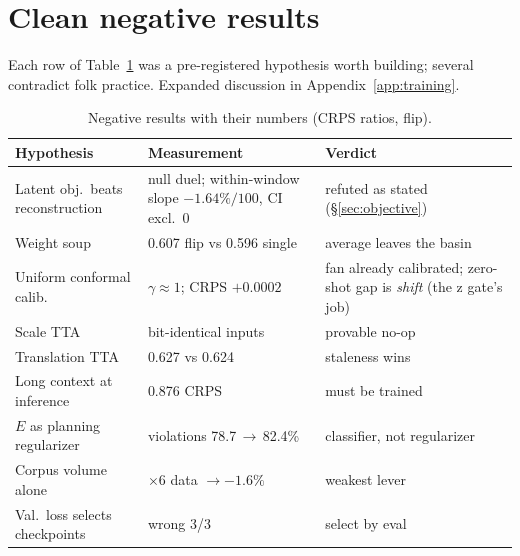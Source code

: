 \section{Clean negative results}
\label{sec:negative}

Each row of Table~\ref{tab:negative} was a pre-registered hypothesis
worth building; several contradict folk practice. Expanded discussion in
Appendix~\ref{app:training}.

\begin{table}[!t]
\centering
\scriptsize
\begin{tabular}{p{2.6cm}p{2.4cm}p{2.4cm}}
\toprule
Hypothesis & Measurement & Verdict \\
\midrule
Latent obj.\ beats reconstruction & null duel; within-window slope $-1.64\%/100$, CI excl.\ 0 & refuted as stated (\S\ref{sec:objective}) \\
Weight soup \citep{wortsman2022soups} & 0.607 flip vs 0.596 single & average leaves the basin \\
Uniform conformal calib.\ \citep{romano2019cqr} & $\gamma\!\approx\!1$; CRPS $+0.0002$ & fan already calibrated; zero-shot gap is \emph{shift} (the z gate's job) \\
Scale TTA & bit-identical inputs & provable no-op \\
Translation TTA & 0.627 vs 0.624 & staleness wins \\
Long context at inference & 0.876 CRPS & must be trained \\
$E$ as planning regularizer & violations 78.7\,$\to$\,82.4\% & classifier, not regularizer \\
Corpus volume alone & $\times 6$ data $\to -1.6\%$ & weakest lever \\
Val.\ loss selects checkpoints & wrong 3/3 & select by eval \\
\bottomrule
\end{tabular}
\caption{Negative results with their numbers (CRPS ratios, flip).}
\label{tab:negative}
\end{table}
